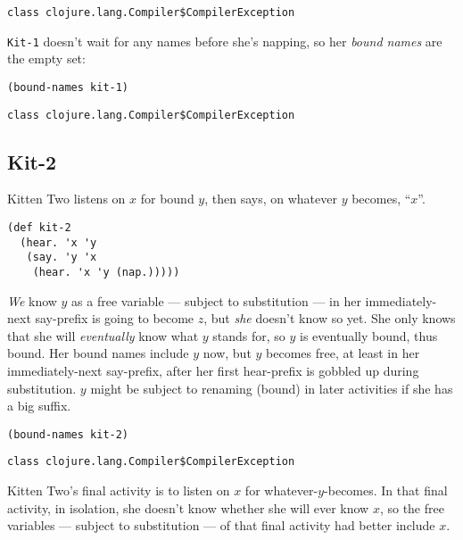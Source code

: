 \documentclass[10pt,oneside,x11names]{article}
\theoremstyle{definition}
\theoremstyle{warning}
\begin{document}
\begin{verbatim}
class clojure.lang.Compiler$CompilerException
\end{verbatim}


\texttt{Kit-1} doesn't wait for any names before she's napping, so her
\emph{bound names} are the empty set:

\vskip 0.26cm
\begin{verbatim}
(bound-names kit-1)
\end{verbatim}

\begin{verbatim}
class clojure.lang.Compiler$CompilerException
\end{verbatim}


\newpage
\subsection{Kit-2}
\label{sec:org078e171}

Kitten Two listens on \(x\) for bound \(y\), then says, on whatever
\(y\) becomes, ``\(x\)''.

\vskip 0.26cm
\begin{verbatim}
(def kit-2
  (hear. 'x 'y
   (say. 'y 'x
    (hear. 'x 'y (nap.)))))
\end{verbatim}

\emph{We} know \(y\) as a free variable --- subject to substitution ---
in her immediately-next say-prefix is going to become \(z\), but
\emph{she} doesn't know so yet. She only knows that she will
\emph{eventually} know what \(y\) stands for, so \(y\) is eventually bound,
thus bound. Her bound names include \(y\) now, but \(y\) becomes free,
at least in her immediately-next say-prefix, after her first
hear-prefix is gobbled up during substitution. \(y\) might be
subject to renaming (bound) in later activities if she has a big
suffix.

\vskip 0.26cm
\begin{verbatim}
(bound-names kit-2)
\end{verbatim}

\begin{verbatim}
class clojure.lang.Compiler$CompilerException
\end{verbatim}


Kitten Two's final activity is to listen on \(x\) for
whatever-\(y\)-becomes. In that final activity, in isolation, she
doesn't know whether she will ever know \(x\), so the free variables
--- subject to substitution --- of that final activity had better
include \(x\).
\end{document}
